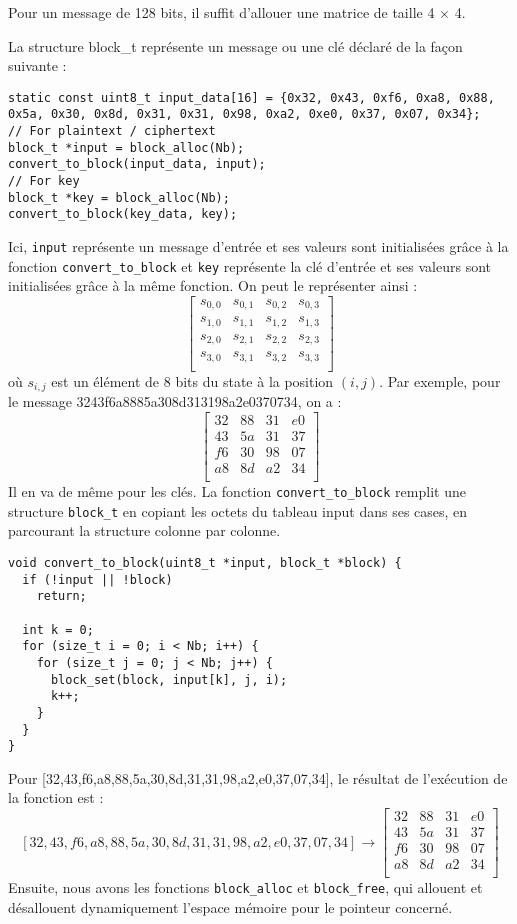 \documentclass[a4paper, 10pt]{article}
\begin{document}
  Pour un message de 128 bits, il suffit d'allouer une matrice de taille 4 $\times$ 4.

  La structure block_t représente un message ou une clé déclaré de la façon suivante :
  \small{
  \begin{verbatim}
static const uint8_t input_data[16] = {0x32, 0x43, 0xf6, 0xa8, 0x88, 0x5a, 0x30, 0x8d, 0x31, 0x31, 0x98, 0xa2, 0xe0, 0x37, 0x07, 0x34};
// For plaintext / ciphertext
block_t *input = block_alloc(Nb);
convert_to_block(input_data, input);
// For key
block_t *key = block_alloc(Nb);
convert_to_block(key_data, key);
  \end{verbatim}
  }
  \normalsize
  Ici, \texttt{input} représente un message d'entrée et ses valeurs sont initialisées grâce à la fonction 
  \texttt{convert\_to\_block} et \texttt{key} représente la clé d'entrée et ses valeurs sont initialisées 
  grâce à la même fonction. On peut le représenter ainsi :
  \[
    \begin{bmatrix}
      s_{0,0}&s_{0,1}& s_{0,2}&s_{0,3}\\
      s_{1,0}&s_{1,1}& s_{1,2}&s_{1,3}\\
      s_{2,0}&s_{2,1}& s_{2,2}&s_{2,3}\\
      s_{3,0}&s_{3,1}& s_{3,2}&s_{3,3}\\
    \end{bmatrix}
  \]
  où \(s_{i,j}\) est un élément de 8 bits du state à la position \((i,j)\). Par exemple, pour le message 
  3243f6a8885a308d313198a2e0370734, on a :
  \[
    \begin{bmatrix}
      32&88&31&e0\\
      43&5a&31&37\\
      f6&30&98&07\\
      a8&8d&a2&34\\
    \end{bmatrix}
  \]
  Il en va de même pour les clés.
  La fonction \texttt{convert_to_block} remplit une structure \texttt{block_t} en copiant les octets 
  du tableau input dans ses cases, en parcourant la structure colonne par colonne. 
  \small{
    \begin{verbatim}
void convert_to_block(uint8_t *input, block_t *block) {
  if (!input || !block)
    return;

  int k = 0;
  for (size_t i = 0; i < Nb; i++) {
    for (size_t j = 0; j < Nb; j++) {
      block_set(block, input[k], j, i);
      k++;
    }
  }
}
    \end{verbatim}
  }
  \normalsize
  Pour [32,43,f6,a8,88,5a,30,8d,31,31,98,a2,e0,37,07,34], le résultat de l'exécution de la fonction est :
  \[ [32,43,f6,a8,88,5a,30,8d,31,31,98,a2,e0,37,07,34] \rightarrow  \begin{bmatrix}
    32&88&31&e0\\
    43&5a&31&37\\
    f6&30&98&07\\
    a8&8d&a2&34\\
  \end{bmatrix}\]
  Ensuite, nous avons les fonctions \texttt{block\_alloc} et \texttt{block\_free}, 
  qui allouent et désallouent dynamiquement l'espace mémoire pour le pointeur concerné.
\end{document}
